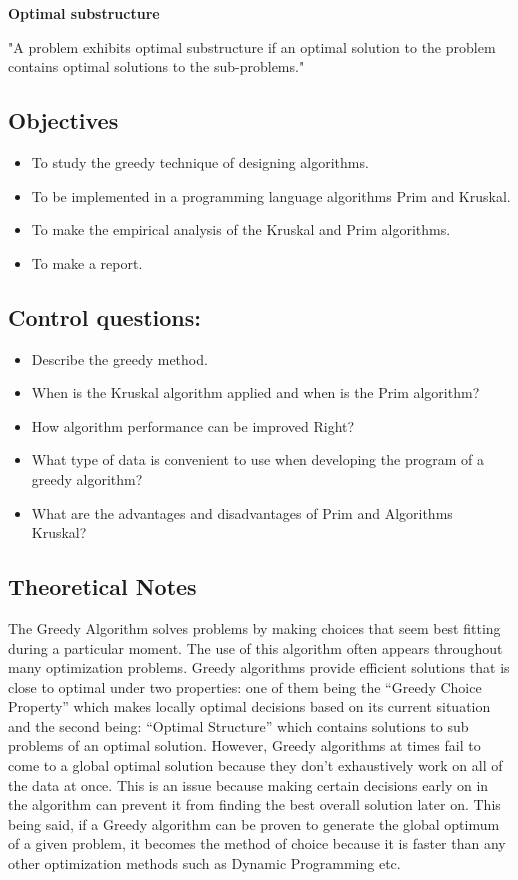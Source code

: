 \documentclass[a4paper, 12pt]{article}
\begin{document}
\textbf{Optimal substructure}

"A problem exhibits optimal substructure if an optimal solution to the problem contains optimal solutions to the sub-problems."

\subsection{Objectives}

\begin{itemize}
      \item To study the greedy technique of designing algorithms.
      \item
            To be implemented in a programming language algorithms
            Prim and Kruskal.
      \item To make the empirical analysis of the Kruskal and Prim algorithms.
      \item To make a report.
\end{itemize}

\subsection{Control questions:}

\begin{itemize}
      \item Describe the greedy method.
      \item When is the Kruskal algorithm applied and when is the Prim algorithm?
      \item How algorithm performance can be improved
            Right?
      \item What type of data is convenient to use when developing the program
            of a greedy algorithm?
      \item What are the advantages and disadvantages of Prim and Algorithms
            Kruskal?
\end{itemize}

\newpage

\subsection{Theoretical Notes}

The Greedy Algorithm solves problems by making choices that seem best fitting during a particular moment. The use of this algorithm often appears throughout many optimization problems. Greedy algorithms provide efficient solutions that is close to optimal under two properties: one of them being the “Greedy Choice Property” which makes locally optimal decisions based on its current situation and the second being: “Optimal Structure” which contains solutions to sub problems of an optimal solution. However, Greedy algorithms at times fail to come to a global optimal solution because they don’t exhaustively work on all of the data at once. This is an issue because making certain decisions early on in the algorithm can prevent it from finding the best overall solution later on. This being said, if a Greedy algorithm can be proven to generate the global optimum of a given problem, it becomes the method of choice because it is faster than any other optimization methods such as Dynamic Programming etc.
\end{document}
